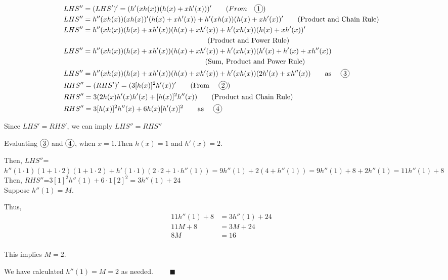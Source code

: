 \documentclass[12pt]{exam}
\newcommand {\DS} [1] {${\displaystyle #1}$}
\newcommand*\circled[1]{\tikz[baseline=(char.base)]{
    \node[shape=circle, draw, inner sep=1pt, 
        minimum height=12pt] (char) {#1};}}
\begin{document}
\begin{enumerate}[resume]
	\begin{align*}
		& LHS''=(LHS')'= (h'(xh(x))(h(x)+xh'(x)))' \qquad (From \quad \circled{1}) \\
		& LHS''= h''(xh(x))(xh(x))'(h(x)+xh'(x))+h'(xh(x))(h(x)+xh'(x))' \qquad  \mbox{(Product and Chain Rule)} \\
		& LHS''= h''(xh(x))(h(x)+xh'(x))(h(x)+xh'(x))+h'(xh(x))(h(x)+xh'(x))' \\
		& \qquad \qquad \qquad \qquad \qquad \qquad \qquad \qquad \qquad \qquad  \mbox{  (Product and Power Rule)}  \\
		& LHS''= h''(xh(x))(h(x)+xh'(x))(h(x)+xh'(x))+h'(xh(x))(h'(x)+h'(x)+xh''(x)) \\
		& \qquad \qquad \qquad \qquad \qquad \qquad \qquad \qquad \qquad \qquad \mbox{(Sum, Product and Power Rule)} \\
		& LHS''= h''(xh(x))(h(x)+xh'(x))(h(x)+xh'(x))+h'(xh(x))(2h'(x)+xh''(x)) \qquad  \mbox{as \quad \circled{3}} \\
		& RHS''= (RHS')'= (3[h(x)]^2h'(x))' \qquad \mbox{(From \quad \circled{2})} \\
		& RHS''= 3(2h(x)h'(x)h'(x)+[h(x)]^2h''(x)) \qquad \mbox{(Product and Chain Rule)} \\
		& RHS''= 3[h(x)]^2h''(x)+6h(x)[h'(x)]^2 \qquad  \mbox{as \quad \circled{4}} \\
	\end{align*}

	Since $LHS'=RHS'$, we can imply $LHS''=RHS''$

	Evaluating $\circled{3}$ and $\circled{4}$, when $x=1$.Then $h(x)=1$ and $h'(x)=2$. 

	Then, \DS{LHS''}=$h''(1\cdot1)(1+1\cdot2)(1+1\cdot2)+h'(1\cdot1)(2\cdot2+1\cdot h''(1))=9h''(1)+2(4+h''(1))=9h''(1)+8+2h''(1)=11h''(1)+8$\\
	
	Then, \DS{RHS''}=$3[1]^2h''(1)+6\cdot1[2]^2=3h''(1)+24$\\
	
	Suppose $h''(1)=M.$
	
	Thus,
	\begin{align*}
	    11h''(1)+8 &= 3h''(1)+24 \\
	    11M+8 &= 3M+24 \\
	    8M &= 16 \\
	\end{align*}

	This implies $M=2.$

	We have calculated $h''(1)=M=2$ as needed. $\quad \quad \blacksquare$


\end{enumerate}
\end{document}
